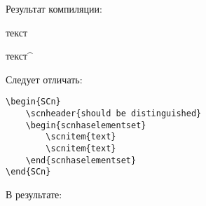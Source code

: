 \begin{SCn}
\end{SCn}

Результат компиляции:

текст\scnrolesign

текст\textasciicircum

Следует отличать:

\begin{lstlisting}
\begin{SCn}
	\scnheader{should be distinguished}
	\begin{scnhaselementset}
		\scnitem{text}
		\scnitem{text}
	\end{scnhaselementset}
\end{SCn}
\end{lstlisting}

В результате:

\begin{SCn}
	\begin{scnhaselementset}
	\end{scnhaselementset}
\end{SCn}
	
\newpage
